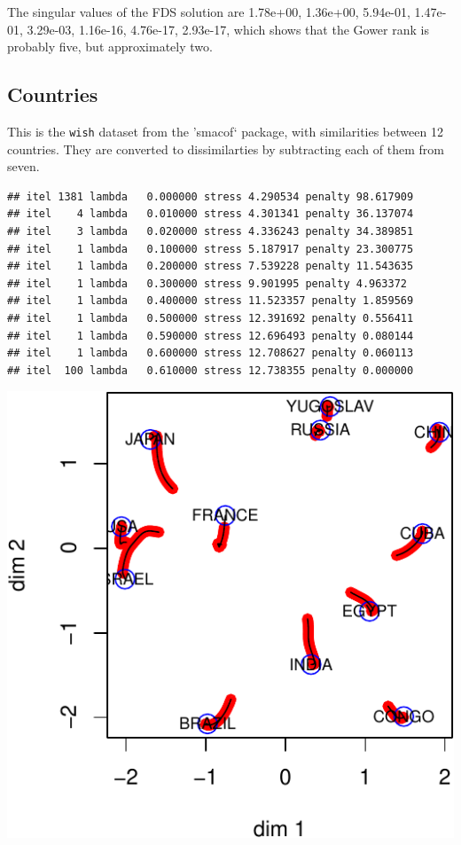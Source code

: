 \documentclass[
  12pt,
]{article}
\begin{document}
The singular values of the FDS solution are 1.78e+00, 1.36e+00,
5.94e-01, 1.47e-01, 3.29e-03, 1.16e-16, 4.76e-17, 2.93e-17, which shows
that the Gower rank is probably five, but approximately two.

\subsection{Countries}\label{countries}

This is the \texttt{wish} dataset from the 'smacof` package, with
similarities between 12 countries. They are converted to dissimilarties
by subtracting each of them from seven.

\begin{verbatim}
## itel 1381 lambda   0.000000 stress 4.290534 penalty 98.617909 
## itel    4 lambda   0.010000 stress 4.301341 penalty 36.137074 
## itel    3 lambda   0.020000 stress 4.336243 penalty 34.389851 
## itel    1 lambda   0.100000 stress 5.187917 penalty 23.300775 
## itel    1 lambda   0.200000 stress 7.539228 penalty 11.543635 
## itel    1 lambda   0.300000 stress 9.901995 penalty 4.963372 
## itel    1 lambda   0.400000 stress 11.523357 penalty 1.859569 
## itel    1 lambda   0.500000 stress 12.391692 penalty 0.556411 
## itel    1 lambda   0.590000 stress 12.696493 penalty 0.080144 
## itel    1 lambda   0.600000 stress 12.708627 penalty 0.060113 
## itel  100 lambda   0.610000 stress 12.738355 penalty 0.000000
\end{verbatim}

\begin{center}\includegraphics{penalty_files/figure-latex/countries-1} \end{center}
\end{document}
